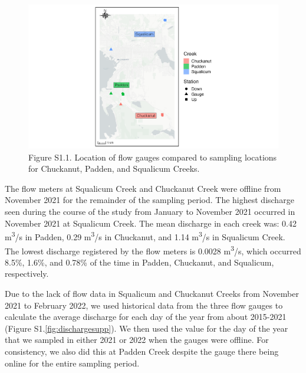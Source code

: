 \documentclass[
]{article}
\begin{document}
\begin{figure}
\centering
\includegraphics{../Output/SupplementalFigures/map_gauges.png}
\caption{Figure S1.1. Location of flow gauges compared to sampling
locations for Chuckanut, Padden, and Squalicum
Creeks.\label{fig:gaugemap}}
\end{figure}

The flow meters at Squalicum Creek and Chuckanut Creek were offline from
November 2021 for the remainder of the sampling period. The highest
discharge seen during the course of the study from January to November
2021 occurred in November 2021 at Squalicum Creek. The mean discharge in
each creek was: 0.42 m\textsuperscript{3}/s in Padden, 0.29
m\textsuperscript{3}/s in Chuckanut, and 1.14 m\textsuperscript{3}/s in
Squalicum Creek. The lowest discharge registered by the flow meters is
0.0028 m\textsuperscript{3}/s, which occurred 8.5\%, 1.6\%, and 0.78\%
of the time in Padden, Chuckanut, and Squalicum, respectively.

Due to the lack of flow data in Squalicum and Chuckanut Creeks from
November 2021 to February 2022, we used historical data from the three
flow gauges to calculate the average discharge for each day of the year
from about 2015-2021 (Figure S1.\ref{fig:dischargesupp}). We then used
the value for the day of the year that we sampled in either 2021 or 2022
when the gauges were offline. For consistency, we also did this at
Padden Creek despite the gauge there being online for the entire
sampling period.
\end{document}
